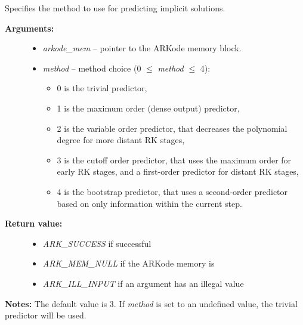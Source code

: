 \documentclass[letterpaper,10pt,english]{sphinxmanual}
\begin{document}
\begin{fulllineitems}
\label{c_interface/User_callable:ARKodeSetPredictorMethod}
Specifies the method to use for predicting implicit solutions.
\begin{description}
\item[{\textbf{Arguments:}}] \leavevmode\begin{itemize}
\item {} 
\emph{arkode\_mem} -- pointer to the ARKode memory block.

\item {} 
\emph{method} -- method choice (0 $\le$ \emph{method} $\le$ 4):
\begin{itemize}
\item {} 
0 is the trivial predictor,

\item {} 
1 is the maximum order (dense output) predictor,

\item {} 
2 is the variable order predictor, that decreases the
polynomial degree for more distant RK stages,

\item {} 
3 is the cutoff order predictor, that uses the maximum order
for early RK stages, and a first-order predictor for distant
RK stages,

\item {} 
4 is the bootstrap predictor, that uses a second-order
predictor based on only information within the current step.

\end{itemize}

\end{itemize}

\item[{\textbf{Return value:}}] \leavevmode\begin{itemize}
\item {} 
\emph{ARK\_SUCCESS} if successful

\item {} 
\emph{ARK\_MEM\_NULL} if the ARKode memory is 

\item {} 
\emph{ARK\_ILL\_INPUT} if an argument has an illegal value

\end{itemize}

\end{description}

\textbf{Notes:} The default value is 3.  If \emph{method} is set to an
undefined value, the trivial predictor will be used.

\end{fulllineitems}
\end{document}
